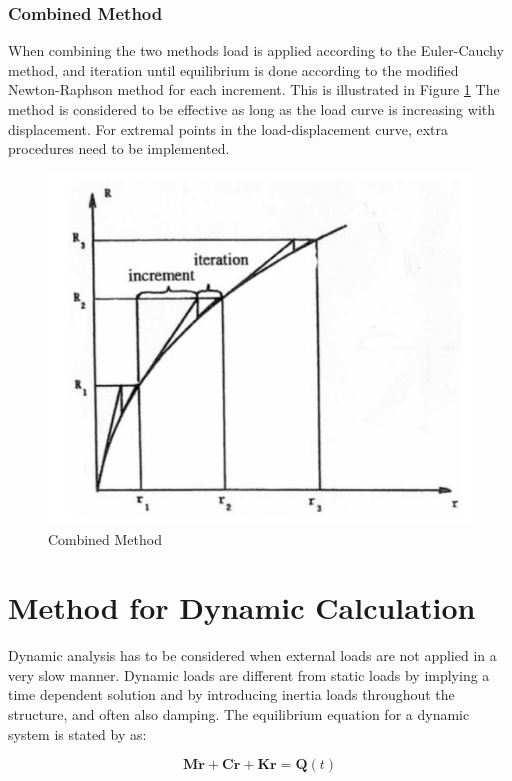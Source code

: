 \subsubsection{Combined Method}
\label{sec:combined}
When combining the two methods load is applied according to the Euler-Cauchy method, and iteration until equilibrium is done according to the modified Newton-Raphson method for each increment. This is illustrated in Figure \ref{fig:combined} The method is considered to be effective as long as the load curve is increasing with displacement. For extremal points in the load-displacement curve, extra procedures need to be implemented.    

 \begin{figure}[H]
\centering
\includegraphics[scale=0.8]{figures/combined}
\caption[$\; \:$Combined Method]{Combined Method \cite{moan2003} }
 \label{fig:combined}
\end{figure}
\section{Method for Dynamic Calculation}
Dynamic analysis has to be considered when external loads are not applied in a very slow manner. Dynamic loads are different from static loads by implying a time dependent solution and by introducing inertia loads throughout the structure, and often also damping. The equilibrium equation for a dynamic system is stated by \cite{Langen1999} as:

\begin{equation}
  \boldsymbol{M \ddot{r}} + \boldsymbol{C \dot{r}} + \boldsymbol{Kr} =  \boldsymbol{Q}(t)
  \label{eq:eq}
\end{equation}


